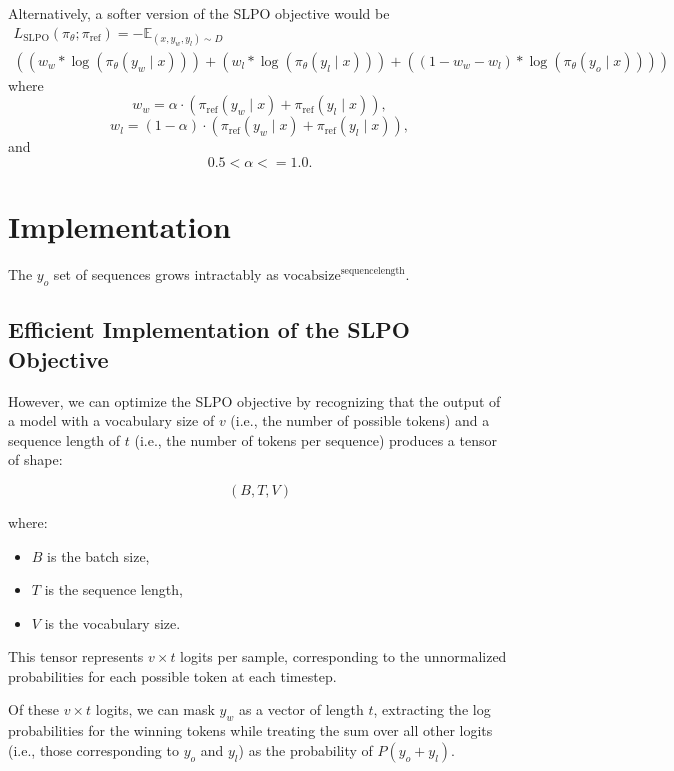 \documentclass[twoside,11pt]{article}
\begin{document}
Alternatively, a softer version of the SLPO objective 
would be
\begin{multline}
  L_\mathrm{SLPO}(\pi_\theta; \pi_\mathrm{ref}) =
  -\mathbb{E}_{(x, y_w, y_l) \sim D} \\
  \left(
  \left(
      w_w * \log(\pi_\theta(y_w \mid x))
  \right)
    + 
  \left(
      w_l * \log(\pi_\theta(y_l \mid x))
  \right)
  + 
  \left(
      (1 - w_w - w_l) * \log(\pi_\theta(y_o \mid x))
  \right) 
  \right)
\end{multline}
where
\[
w_w = \alpha \cdot \left( \pi_\mathrm{ref}(y_w \mid x) + \pi_\mathrm{ref}(y_l \mid x) \right),
\]
\[
w_l = (1 - \alpha) \cdot \left( \pi_\mathrm{ref}(y_w \mid x) + \pi_\mathrm{ref}(y_l \mid x) \right),
\]
and 
\[
0.5 < \alpha <= 1.0.
\]

\section{Implementation}

The $y_o$ set of sequences grows intractably as 
$\mathrm{vocab size}^{\mathrm{sequence length}}$.

\subsection{Efficient Implementation of the SLPO Objective}

However, we can optimize the SLPO objective by 
recognizing that the output of a model with a vocabulary size of 
$v$ (i.e., the number of possible tokens) and a 
sequence length of $t$ (i.e., the number of tokens per sequence) 
produces a tensor of shape:

\[
(B, T, V)
\]

where:
\begin{itemize}
    \item $B$ is the batch size,
    \item $T$ is the sequence length,
    \item $V$ is the vocabulary size.
\end{itemize}

This tensor represents $v \times t$ logits per sample, corresponding to the unnormalized probabilities for each possible token at each timestep.

Of these $v \times t$ logits, we can mask $y_w$ as a vector of length $t$, extracting the log probabilities for the winning tokens while treating the sum over all other logits (i.e., those corresponding to $y_o$ and $y_l$) as the probability of $P(y_o + y_l)$.
\end{document}
